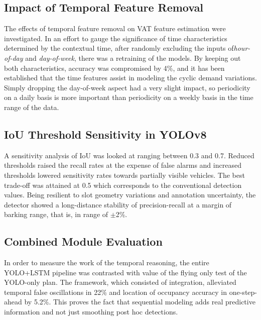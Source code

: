 \documentclass[conference]{IEEEtran}
\begin{document}
\subsection{Impact of Temporal Feature Removal}
The effects of temporal feature removal on VAT feature estimation were investigated.
In an effort to gauge the significance of time characteristics determined by the contextual time, after randomly excluding the inputs of\textit{hour-of-day} and \textit{day-of-week}, there was a retraining of the models. By keeping out both characteristics, accuracy was compromised by 4\%, and it has been established that the time features assist in modeling the cyclic demand variations. Simply dropping the day-of-week aspect had a very slight impact, so periodicity on a daily basis is more important than periodicity on a weekly basis in the time range of the data.

\subsection{IoU Threshold Sensitivity in YOLOv8}
A sensitivity analysis of IoU was looked at ranging between 0.3 and 0.7. Reduced thresholds raised the recall rates at the expense of false alarms and increased thresholds lowered sensitivity rates towards partially visible vehicles. The best trade-off was attained at 0.5 which corresponds to the conventional detection values. Being resilient to slot geometry variations and annotation uncertainty, the detector showed a long-distance stability of precision-recall at a margin of barking range, that is, in range of $\pm$2\%.

\subsection{Combined Module Evaluation}
In order to measure the work of the temporal reasoning, the entire YOLO+LSTM pipeline was contrasted with value of the flying only test of the YOLO-only plan. The framework, which consisted of integration, alleviated temporal false oscillations in 22\% and location of occupancy accuracy in one-step-ahead by 5.2\%. This proves the fact that sequential modeling adds real predictive information and not just smoothing post hoc detections.
\end{document}
